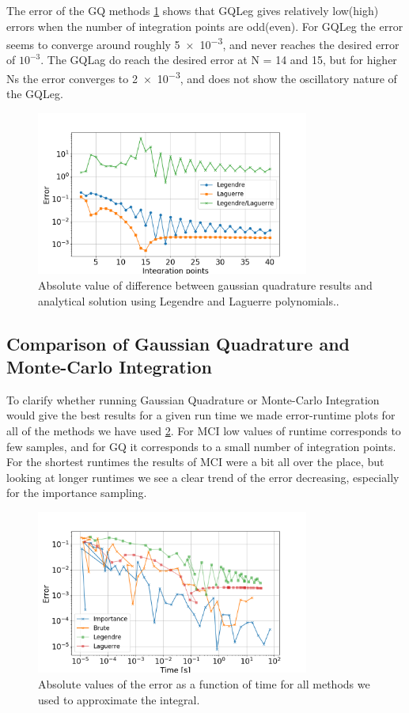 The error of the GQ methods \cref{fig:gauss_error} shows that GQLeg gives relatively
low(high) errors when the number of integration points are odd(even). For GQLeg
the error seems to converge around roughly \num{ 5e-3}, and never reaches the
desired error of $10^{-3}$. The GQLag do reach the desired error at N = 14 and 15,
but for higher Ns the error converges to \num{2e-3}, and does not show the oscillatory
nature of the GQLeg.

\begin{figure}[H]
  \centering
  \includegraphics[width=0.8\textwidth]{../figures/gauss_error.png}
  \caption{Absolute value of difference between gaussian quadrature results and analytical
  solution using Legendre and Laguerre polynomials..}

  \label{fig:gauss_error}
\end{figure}


\subsection{Comparison of Gaussian Quadrature and Monte-Carlo Integration}

To clarify whether running Gaussian Quadrature or Monte-Carlo Integration would
give the best results for a given run time we made error-runtime plots for all
of the methods we have used \cref{fig:time_compare}. For MCI low values of runtime
corresponds to few samples, and for GQ it corresponds to a small number of integration points.
For the shortest runtimes the results of MCI were a bit all over the place, but
looking at longer runtimes we see a clear trend of the error decreasing, especially
for the importance sampling.


\begin{figure}[H]
  \centering
  \includegraphics[width=0.8\textwidth]{../figures/time_compare.png}
  \caption{Absolute values of the error as a function of time for all methods we
  used to approximate the integral.}

  \label{fig:time_compare}
\end{figure}
